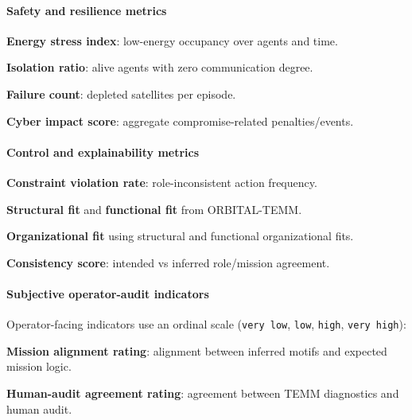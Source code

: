 \documentclass[sigconf]{aamas}
\begin{document}
\paragraph{Safety and resilience metrics}
\begin{enumerate*}[label={\roman*) },itemjoin={; \quad}]
    \item \textbf{Energy stress index}: low-energy occupancy over agents and time.
    \item \textbf{Isolation ratio}: alive agents with zero communication degree.
    \item \textbf{Failure count}: depleted satellites per episode.
    \item \textbf{Cyber impact score}: aggregate compromise-related penalties/events.
\end{enumerate*}

\paragraph{Control and explainability metrics}
\begin{enumerate*}[label={\roman*) },itemjoin={; \quad}]
    \item \textbf{Constraint violation rate}: role-inconsistent action frequency.
    \item \textbf{Structural fit} and \textbf{functional fit} from ORBITAL-TEMM.
    \item \textbf{Organizational fit} using structural and functional organizational fits.
    \item \textbf{Consistency score}: intended vs inferred role/mission agreement.
\end{enumerate*}

\paragraph{Subjective operator-audit indicators}
Operator-facing indicators use an ordinal scale (\texttt{very low}, \texttt{low}, \texttt{high}, \texttt{very high}):
\begin{enumerate*}[label={\roman*) },itemjoin={; \quad}]
    \item \textbf{Mission alignment rating}: alignment between inferred motifs and expected mission logic.
    \item \textbf{Human-audit agreement rating}: agreement between TEMM diagnostics and human audit.
\end{enumerate*}
\end{document}
